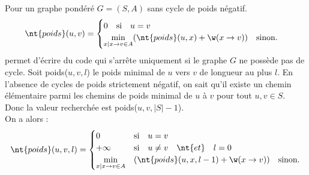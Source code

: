 \documentclass[french, 11pt]{article}
\begin{document}
\begin{defi}{}{}
    Pour un graphe pondéré $G=(S,A)$ sans cycle de poids négatif. 
    \begin{equation*}
        \nt{poids}(u,v)=\begin{cases}
            0 \quad \text{si} \quad u=v\\
            \min\limits_{x\mid x\to v \in A}(\nt{poids}(u,x)+\w(x\to v)) \quad \text{sinon}.
        \end{cases}
    \end{equation*}
    permet d'écrire du code qui s'arrête uniquement si le graphe $G$ ne possède pas de cycle.\n
    Soit poids($u,v,l$) le poids minimal de $u$ vers $v$ de longueur au plus $l$. En l'absence de cycles de poids strictement négatif, on sait qu'il existe un chemin élémentaire parmi les chemins de poids minimal de $u$ à $v$ pour tout $u,v\in S$.\\
    Donc la valeur recherchée est poids($u,v,|S|-1$).\\
    On a alors :
    \begin{equation*}
        \nt{poids}(u,v,l)=\begin{cases}
            0 \quad &\text{si} \quad u=v\\
            +\infty \quad &\text{si} \quad u\neq v \quad \nt{et} \quad l=0\\
            \min\limits_{x\mid x\to v \in A}&(\nt{poids}(u,x,l-1)+\w(x\to v)) \quad \text{sinon}.
        \end{cases}
    \end{equation*}
\end{defi}

\begin{defi}{}{}
    \begin{algorithm}[H]
        \caption{Poids minimal pour toutes les paires.}
    \end{algorithm}
\end{defi}
\end{document}
